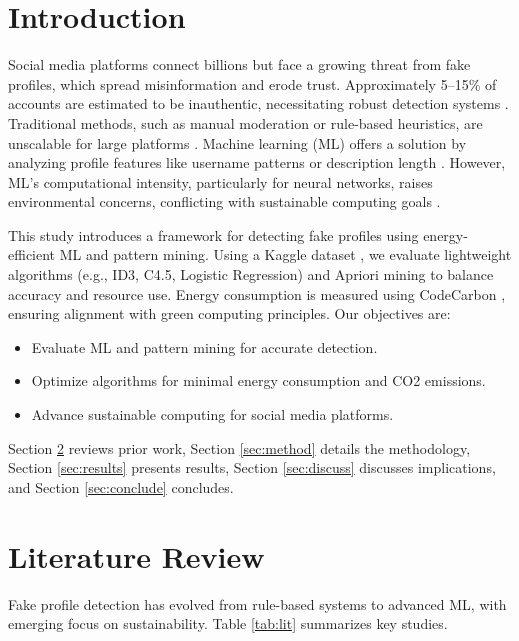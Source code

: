 \documentclass[conference]{IEEEtran}
\begin{document}
\section{Introduction}
Social media platforms connect billions but face a growing threat from fake profiles, which spread misinformation and erode trust. Approximately 5--15\% of accounts are estimated to be inauthentic, necessitating robust detection systems \cite{b1,b9}. Traditional methods, such as manual moderation or rule-based heuristics, are unscalable for large platforms \cite{b2}. Machine learning (ML) offers a solution by analyzing profile features like username patterns or description length \cite{b3}. However, ML’s computational intensity, particularly for neural networks, raises environmental concerns, conflicting with sustainable computing goals \cite{b4}.

This study introduces a framework for detecting fake profiles using energy-efficient ML and pattern mining. Using a Kaggle dataset \cite{b5}, we evaluate lightweight algorithms (e.g., ID3, C4.5, Logistic Regression) and Apriori mining to balance accuracy and resource use. Energy consumption is measured using CodeCarbon \cite{b13}, ensuring alignment with green computing principles. Our objectives are:
\begin{itemize}
    \item Evaluate ML and pattern mining for accurate detection.
    \item Optimize algorithms for minimal energy consumption and CO2 emissions.
    \item Advance sustainable computing for social media platforms.
\end{itemize}

Section \ref{sec:lit} reviews prior work, Section \ref{sec:method} details the methodology, Section \ref{sec:results} presents results, Section \ref{sec:discuss} discusses implications, and Section \ref{sec:conclude} concludes.

\section{Literature Review}
\label{sec:lit}
Fake profile detection has evolved from rule-based systems to advanced ML, with emerging focus on sustainability. Table \ref{tab:lit} summarizes key studies.
\end{document}
